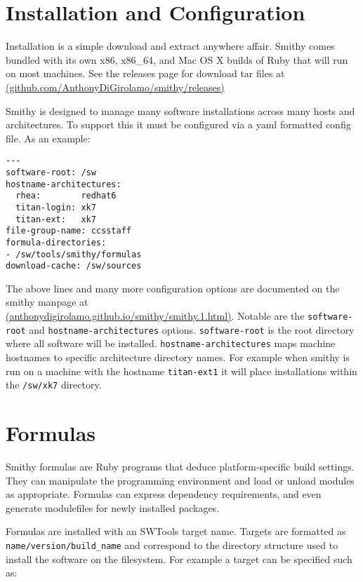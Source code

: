 \documentclass{acm_proc_article-sp}
\begin{document}
\section{Installation and Configuration}

Installation is a simple download and extract anywhere affair. Smithy comes
bundled with its own x86, x86\_64, and Mac OS X builds of Ruby that will run on
most machines.  See the releases page for download tar files at \\
\href{http://github.com/AnthonyDiGirolamo/smithy/releases}{(github.com/AnthonyDiGirolamo/smithy/releases)}

Smithy is designed to manage many software installations across many hosts and
architectures. To support this it must be configured via a yaml formatted config
file. As an example:

\begin{quoting}
\begin{verbatim}
---
software-root: /sw
hostname-architectures:
  rhea:        redhat6
  titan-login: xk7
  titan-ext:   xk7
file-group-name: ccsstaff
formula-directories:
- /sw/tools/smithy/formulas
download-cache: /sw/sources
\end{verbatim}
\end{quoting}

The above lines and many more configuration options are documented on the smithy
manpage at \\
\href{http://anthonydigirolamo.github.io/smithy/smithy.1.html}{(anthonydigirolamo.github.io/smithy/smithy.1.html)}.
Notable are the \texttt{software-root} and \texttt{hostname-architectures}
options. \texttt{software-root} is the root directory where all software will be
installed. \texttt{hostname-architectures} maps machine hostnames to specific
architecture directory names. For example when smithy is run on a machine with
the hostname \texttt{titan-ext1} it will place installations within the
\texttt{/sw/xk7} directory.

\section{Formulas}

Smithy formulas are Ruby programs that deduce platform-specific build settings.
They can manipulate the programming environment and load or unload modules as
appropriate. Formulas can express dependency requirements, and even generate
modulefiles for newly installed packages.

Formulas are installed with an SWTools target name. Targets are formatted as
\texttt{name/version/build\_name} and correspond to the directory structure used
to install the software on the filesystem.  For example a target can be
specified such as:
\end{document}
